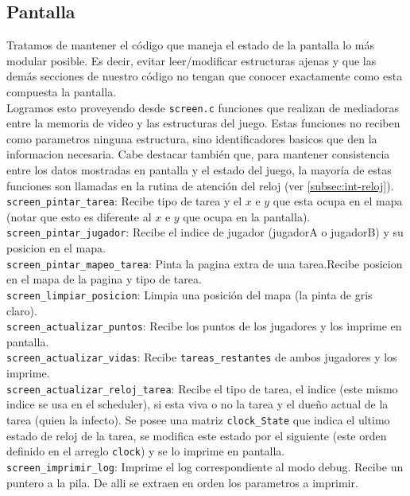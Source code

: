 \subsection{Pantalla}

Tratamos de mantener el código que maneja el estado de la pantalla lo más modular posible. Es decir, evitar leer/modificar estructuras ajenas  y que las demás secciones de nuestro código no tengan que conocer exactamente como esta compuesta la pantalla.\\

Logramos esto proveyendo desde  \verb|screen.c| funciones que realizan de mediadoras entre la memoria de video y las estructuras del juego. Estas funciones no reciben como parametros ninguna estructura, sino identificadores basicos que den la informacion necesaria. Cabe destacar también que, para mantener consistencia entre los datos mostradas en pantalla y el estado del juego, la mayoría de estas funciones son llamadas en la rutina de atención del reloj (ver \ref{subsec:int-reloj}).\\


\verb|screen_pintar_tarea|: Recibe tipo de tarea y el $x$ e $y$ que esta ocupa en el mapa (notar que esto es diferente al $x$ e $y$ que ocupa en la pantalla).\\

\verb|screen_pintar_jugador|: Recibe el indice de jugador (jugadorA o jugadorB) y su posicion en el mapa.\\

\verb|screen_pintar_mapeo_tarea|: Pinta la pagina extra de una tarea.Recibe posicion en el mapa de la pagina y tipo de tarea.\\

\verb|screen_limpiar_posicion|: Limpia una posición del mapa (la pinta de gris claro).\\

\verb|screen_actualizar_puntos|: Recibe los puntos de los jugadores y los imprime en pantalla.\\

\verb|screen_actualizar_vidas|: Recibe \verb|tareas_restantes| de ambos jugadores y los imprime.\\

\verb|screen_actualizar_reloj_tarea|: Recibe el tipo de tarea, el indice (este mismo indice se usa en el scheduler), si esta viva o no la tarea y el dueño actual de la tarea (quien la infecto). Se posee una matriz \verb|clock_State| que indica el ultimo estado de reloj de la tarea, se modifica este estado por el siguiente (este orden definido en el arreglo \verb|clock|) y se lo imprime en pantalla.\\

\verb|screen_imprimir_log|: Imprime el log correspondiente al modo debug. Recibe un puntero a la pila. De alli se extraen en orden los parametros a imprimir.\\

